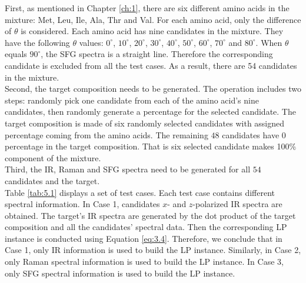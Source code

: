 First, as mentioned in Chapter \ref{ch:1}, there are six different amino acids in the mixture: Met, Leu, Ile, Ala, Thr and Val. For each amino acid, only the difference of $\theta$ is considered. Each amino acid has nine candidates in the mixture. They have the following $\theta$ values: $0^{\circ}$,  $10^{\circ}$, $20^{\circ}$, $30^{\circ}$, $40^{\circ}$, $50^{\circ}$, $60^{\circ}$, $70^{\circ}$ and $80^{\circ}$. When $\theta$ equals $90^{\circ}$, the SFG spectra is a straight line. Therefore the corresponding candidate is excluded from all the test cases. As a result, there are 54 candidates in the mixture. \\

Second, the target composition needs to be generated. The operation includes two steps: randomly pick one candidate from each of the amino acid's nine candidates, then randomly generate a percentage for the selected candidate. The target composition is made of six randomly selected candidates with assigned percentage coming from the amino acids. The remaining $48$ candidates have $0$ percentage in the target composition. That is six selected candidate makes 100\% component of the mixture. \\

Third, the IR, Raman and SFG spectra need to be generated for all $54$ candidates and the target. \\

Table \ref{tab:5.1} displays a set of test cases. Each test case contains different spectral information. In Case 1, candidates $x$- and $z$-polarized IR spectra are obtained. The target's IR spectra are generated by the dot product of the target composition and all the candidates' spectral data. Then the corresponding LP instance is conducted using Equation \ref{eq:3.4}. Therefore, we conclude that in Case 1, only IR information is used to build the LP instance. Similarly, in Case 2, only Raman spectral information is used to build the LP instance. In Case 3, only SFG spectral information is used to build the LP instance. \\

